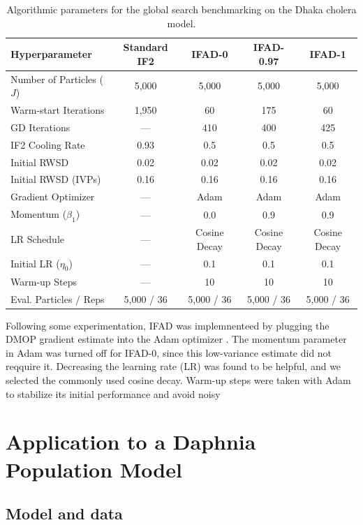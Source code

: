 \documentclass[11pt]{article}
\theoremstyle{thmstylethree}%
\begin{document}
\begin{table}[H]
\centering
\begin{tabular}{p{4.5cm}cccc}
\toprule
\textbf{Hyperparameter} & \textbf{Standard IF2} & \textbf{IFAD-0} & \textbf{IFAD-0.97} & \textbf{IFAD-1} \\
\midrule
Number of Particles ($J$) & 5,000 & 5,000 & 5,000 & 5,000 \\
Warm-start Iterations & 1,950 & 60 & 175 & 60 \\
GD Iterations & --- & 410 & 400 & 425 \\
IF2 Cooling Rate & 0.93 & 0.5 & 0.5 & 0.5 \\
Initial RWSD & 0.02 & 0.02 & 0.02 & 0.02 \\
Initial RWSD (IVPs) & 0.16 & 0.16 & 0.16 & 0.16 \\
Gradient Optimizer & --- & Adam & Adam & Adam \\
Momentum ($\beta_1$) & --- & 0.0 & 0.9 & 0.9 \\
LR Schedule & --- & Cosine Decay & Cosine Decay & Cosine Decay \\
Initial LR ($\eta_0$) & --- & 0.1 & 0.1 & 0.1 \\
Warm-up Steps & --- & 10 & 10 & 10 \\
Eval. Particles / Reps & 5,000 / 36 & 5,000 / 36 & 5,000 / 36 & 5,000 / 36 \\
\bottomrule
\end{tabular}
\caption{Algorithmic parameters for the global search benchmarking on the Dhaka cholera model.}
\label{table:algparams}
\end{table}

Following some experimentation, IFAD was implemnenteed by plugging the DMOP gradient estimate into the Adam optimizer \citep{kingma15}.
The momentum parameter in Adam was turned off for IFAD-0, since this low-variance estimate did not reqquire it.
Decreasing the learning rate (LR) was found to be helpful, and we selected the commonly used cosine decay.
Warm-up steps were taken with Adam to stabilize its initial performance and avoid noisy 


\clearpage

\section{Application to a Daphnia Population Model}
\label{sec:daphnia}

\subsection{Model and data}
\end{document}
